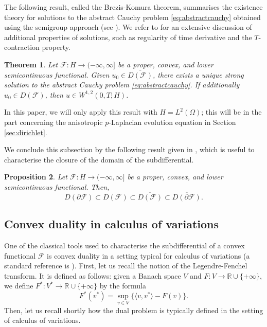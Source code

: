 \documentclass[reqno,12pt]{amsart}
\newtheorem{theorem}{Theorem}[section]
\newtheorem{proposition}[theorem]{Proposition}
\numberwithin{equation}{section}
\begin{document}
The following result, called the Brezis-Komura theorem, summarises the existence theory for solutions to the abstract Cauchy problem \eqref{eq:abstractcauchy} obtained using the semigroup approach (see \cite{Brezis}). We refer to \cite{Brezis} for an extensive discussion of additional properties of solutions, such as regularity of time derivative and the $T$-contraction property.

\begin{theorem}\label{thm:breziskomura}
Let $\mathcal{F} : H \to (-\infty, \infty]$ be a proper, convex, and lower semicontinuous functional. Given $u_0 \in \overline{D(\mathcal{F})}$, there exists a unique strong solution to the abstract Cauchy problem \eqref{eq:abstractcauchy}. If additionally $u_0 \in D(\mathcal{F})$, then $u \in W^{1,2}(0, T; H)$. 
\end{theorem}

In this paper, we will only apply this result with $H = L^2(\Omega)$; this will be in the part concerning the anisotropic $p$-Laplacian evolution equation in Section \ref{sec:dirichlet}.

We conclude this subsection by the following result given in \cite[Proposition 2.11]{Brezis}, which is useful to characterise the closure of the domain of the subdifferential.

\begin{proposition}\label{prop:domain} 
Let $\mathcal{F}: H \to (-\infty, \infty]$ be a proper, convex, and lower semicontinuous functional. Then,
$$D(\partial \mathcal{F}) \subset D( \mathcal{F}) \subset \overline{ D( \mathcal{F})} \subset \overline{ D( \partial \mathcal{F})}.$$
\end{proposition}


\subsection{Convex duality in calculus of variations}\label{subsec:convexduality}

One of the classical tools used to characterise the subdifferential of a convex functional $\mathcal{F}$ is convex duality in a setting typical for calculus of variations (a standard reference is \cite[Chapter III.4]{EkelandTemam}). First, let us recall the notion of the Legendre-Fenchel transform. It is defined as follows: given a Banach space $V$ and $F: V \rightarrow \mathbb{R} \cup \{ + \infty \}$, we define $F^*: V^* \rightarrow \mathbb{R} \cup \{ + \infty \}$ by the formula
\begin{equation*}
F^*(v^*) = \sup_{v \in V} \bigg\{ \langle v, v^* \rangle - F(v) \bigg\}.
\end{equation*}
Then, let us recall shortly how the dual problem is typically defined in the setting of calculus of variations. 
\end{document}
